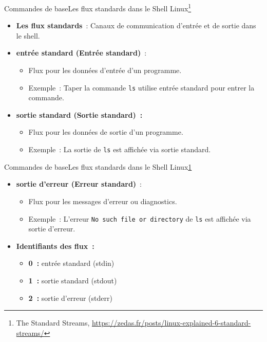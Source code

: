 \documentclass{beamer}
\begin{document}
    \begin{frame}{Commandes de base}{Les flux standards dans le Shell Linux\footnote{\label{standard-stream}The Standard Streams, \url{https://zedas.fr/posts/linux-explained-6-standard-streams/}}}
        \begin{itemize}
            \item \textbf{Les flux standards}~: Canaux de communication d'entrée et de sortie dans le shell.
            \item \textbf{entrée standard (Entrée standard)}~:
            \begin{itemize}
                \item Flux pour les données d'entrée d'un programme.
                \item Exemple~: Taper la commande \lstinline{ls} utilise entrée standard pour entrer la commande.
            \end{itemize}
            \item \textbf{sortie standard (Sortie standard)~:}
            \begin{itemize}
                \item Flux pour les données de sortie d'un programme.
                \item Exemple~: La sortie de \lstinline{ls} est affichée via sortie standard.
            \end{itemize}
        \end{itemize}
    \end{frame}

    \begin{frame}{Commandes de base}{Les flux standards dans le Shell Linux\cref{standard-stream}}
        \begin{itemize}
            \item \textbf{sortie d'erreur (Erreur standard)}~:
            \begin{itemize}
                \item Flux pour les messages d'erreur ou diagnostics.
                \item Exemple~: L'erreur \lstinline{No such file or directory} de \lstinline{ls} est affichée via sortie d'erreur.
            \end{itemize}
            \item \textbf{Identifiants des flux~:}
            \begin{itemize}
                \item \textbf{0~:} entrée standard (stdin)
                \item \textbf{1~:} sortie standard (stdout)
                \item \textbf{2~:} sortie d'erreur (stderr)
            \end{itemize}
        \end{itemize}
    \end{frame}
\end{document}
